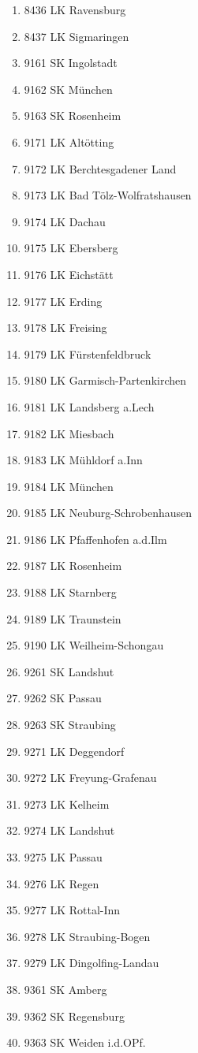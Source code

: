\begin{enumerate}[itemsep=-6mm]
\item 8436 LK Ravensburg
\item 8437 LK Sigmaringen
\item 9161 SK Ingolstadt
\item 9162 SK München
\item 9163 SK Rosenheim
\item 9171 LK Altötting
\item 9172 LK Berchtesgadener Land
\item 9173 LK Bad Tölz-Wolfratshausen
\item 9174 LK Dachau
\item 9175 LK Ebersberg
\item 9176 LK Eichstätt
\item 9177 LK Erding
\item 9178 LK Freising
\item 9179 LK Fürstenfeldbruck
\item 9180 LK Garmisch-Partenkirchen
\item 9181 LK Landsberg a.Lech
\item 9182 LK Miesbach
\item 9183 LK Mühldorf a.Inn
\item 9184 LK München
\item 9185 LK Neuburg-Schrobenhausen
\item 9186 LK Pfaffenhofen a.d.Ilm
\item 9187 LK Rosenheim
\item 9188 LK Starnberg
\item 9189 LK Traunstein
\item 9190 LK Weilheim-Schongau
\item 9261 SK Landshut
\item 9262 SK Passau
\item 9263 SK Straubing
\item 9271 LK Deggendorf
\item 9272 LK Freyung-Grafenau
\item 9273 LK Kelheim
\item 9274 LK Landshut
\item 9275 LK Passau
\item 9276 LK Regen
\item 9277 LK Rottal-Inn
\item 9278 LK Straubing-Bogen
\item 9279 LK Dingolfing-Landau
\item 9361 SK Amberg
\item 9362 SK Regensburg
\item 9363 SK Weiden i.d.OPf.

\end{enumerate}
